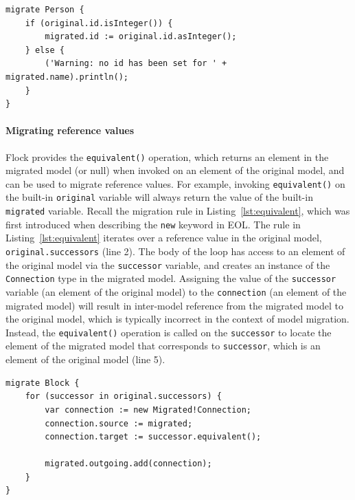 \begin{lstlisting}[caption=Casting feature values, label=lst:casting_values, language=Flock, float=tb]
migrate Person {
	if (original.id.isInteger()) {
		migrated.id := original.id.asInteger();
	} else {
		('Warning: no id has been set for ' + migrated.name).println();
	}
}
\end{lstlisting}

\paragraph{Migrating reference values} Flock provides the \texttt{eq\-ui\-va\-le\-nt()} operation, which returns an element in the migrated model (or null) when invoked on an element of the original model, and can be used to migrate reference values. For example, invoking \texttt{eq\-ui\-va\-le\-nt()} on the built-in \texttt{or\-ig\-in\-al} variable will always return the value of the built-in \texttt{mi\-gr\-at\-ed} variable. Recall the migration rule in Listing~\ref{lst:equivalent}, which was first introduced when describing the \texttt{new} keyword in EOL. The rule in Listing~\ref{lst:equivalent} iterates over a reference value in the original model, \texttt{or\-ig\-in\-al.su\-cc\-es\-so\-rs} (line 2). The body of the loop has access to an element of the original model via the \texttt{su\-cc\-es\-s\-or} variable, and creates an instance of the \texttt{Co\-nn\-ec\-ti\-on} type in the migrated model. Assigning the value of the \texttt{su\-cc\-es\-s\-or} variable (an element of the original model) to the \texttt{co\-nn\-ec\-ti\-on} (an element of the migrated model) will result in inter-model reference from the migrated model to the original model, which is typically incorrect in the context of model migration. Instead, the \texttt{eq\-ui\-va\-le\-nt()} operation is called on the \texttt{su\-cc\-es\-s\-or} to locate the element of the migrated model that corresponds to \texttt{su\-cc\-es\-s\-or}, which is an element of the original model (line 5).

\begin{lstlisting}[caption=Using \texttt{equivalent()} to access migrated model elements, label=lst:equivalent, language=Flock, float=tb]
migrate Block {
	for (successor in original.successors) {
		var connection := new Migrated!Connection;
		connection.source := migrated;
		connection.target := successor.equivalent();

		migrated.outgoing.add(connection);
	}
}
\end{lstlisting}

